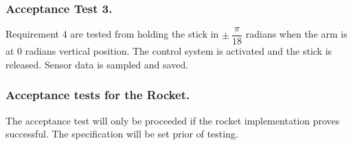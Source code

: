 \subsubsection*{Acceptance Test 3.}
\forceindent Requirement 4 are tested from holding the stick in $\pm\ \dfrac{\pi}{18}$ radians when the arm is at 0 radians vertical position. The control system is activated and the stick is released. Sensor data is sampled and saved.

\subsubsection*{Acceptance tests for the Rocket.}
\forceindent The acceptance test will only be proceeded if the rocket implementation proves successful. The specification will be set prior of testing.  